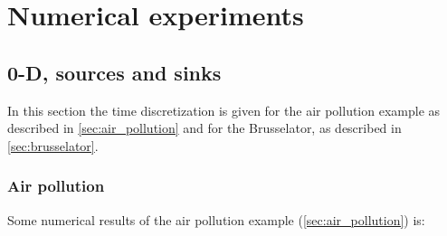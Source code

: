\chapter{Numerical experiments}\label{sec:numerical_experiments}
\section{0-D, sources and sinks}\label{sec:0d_sources_and_sinks}
In this section the time discretization is given for
the air pollution example as described in \autoref{sec:air_pollution}
and for
the Brusselator, as described in \autoref{sec:brusselator}.
\subsection{Air pollution}
Some numerical results of the air pollution example (\autoref{sec:air_pollution}) is:
